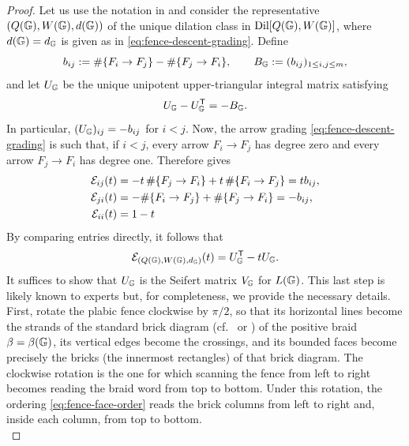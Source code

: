 \begin{proof} Let us use the notation in  and consider the representative $(Q(\mathbb G),W(\mathbb G),d(\mathbb G))$ of the unique dilation class in $\operatorname{Dil}[Q(\mathbb G),W(\mathbb G)]$, where $d(\mathbb G)=d_\mathbb G$ is given as in \eqref{eq:fence-descent-grading}. Define
\[
 b_{ij}:=\#\{F_i\to F_j\}-\#\{F_j\to F_i\},
 \qquad B_{\mathbb G}:=(b_{ij})_{1\leq i,j\leq m},
\]
and let $U_{\mathbb G}$ be the unique unipotent upper-triangular integral matrix satisfying
\begin{equation}\label{eq:fence-companion}
 U_{\mathbb G}-U_{\mathbb G}^{\mathsf T}=-B_{\mathbb G}.
\end{equation}
In particular, $(U_{\mathbb G})_{ij}=-b_{ij}$ for $i<j$. Now, the arrow grading \eqref{eq:fence-descent-grading} is such that, if $i<j$, every arrow
$F_i\to F_j$ has degree zero and every arrow $F_j\to F_i$ has degree one.
Therefore  gives
\begin{align*}
 \mathcal E_{ij}(t)
 &=-t\,\#\{F_j\to F_i\}
   +t\,\#\{F_i\to F_j\}
   =t b_{ij},\\
 \mathcal E_{ji}(t)
 &=-\#\{F_i\to F_j\}
   +\#\{F_j\to F_i\}
   =-b_{ij},\\
\mathcal E_{ii}(t)
&=1-t
\end{align*}
By comparing entries directly, it follows that
\begin{equation}\label{eq:fence-euler-companion}
 \mathcal E_{(Q(\mathbb G),W(\mathbb G),d_{\mathbb G})}(t)
 =U_{\mathbb G}^{\mathsf T}-tU_{\mathbb G}.
\end{equation}
It suffices to show that $U_{\mathbb G}$ is the Seifert matrix $V_\mathbb G$ for $L(\mathbb G)$. This last step is likely known to experts but, for completeness, we provide the necessary details.\\

First, rotate the plabic fence clockwise by $\pi/2$, so that its horizontal lines become
the strands of the standard brick diagram (cf.~\cite[Section 3]{BaaderDehornoy} or \cite[Section 2]{Ferretti}) of the positive braid
$\beta=\beta(\mathbb G)$, its vertical edges become the crossings, and its bounded
faces become precisely the bricks (the innermost rectangles) of that brick
diagram.  The clockwise rotation is the one for which scanning the fence from
left to right becomes reading the braid word from top to bottom.  Under this
rotation, the ordering \eqref{eq:fence-face-order} reads the brick columns from
left to right and, inside each column, from top to bottom.\\


\end{proof}
